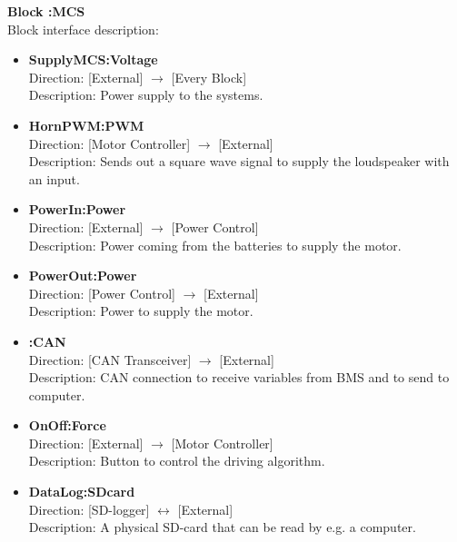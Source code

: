 \textbf{Block :MCS}\\
Block interface description:
\begin{itemize}
	\item \textbf{SupplyMCS:Voltage}\\
	Direction: [External] $\rightarrow$ [Every Block]\\
	Description: Power supply to the systems.
	\item \textbf{HornPWM:PWM}\\
	Direction: [Motor Controller] $\rightarrow$ [External]\\
	Description: Sends out a square wave signal to supply the loudspeaker with an input.
	\item \textbf{PowerIn:Power}\\
	Direction: [External] $\rightarrow$ [Power Control]\\
	Description: Power coming from the batteries to supply the motor.
	\item \textbf{PowerOut:Power}\\
	Direction: [Power Control] $\rightarrow$ [External]\\
	Description: Power to supply the motor.
	\item \textbf{:CAN}\\
	Direction: [CAN Transceiver] $\rightarrow$ [External]\\
	Description: CAN connection to receive variables from BMS and to send to computer.
	\item \textbf{OnOff:Force}\\
	Direction: [External] $\rightarrow$ [Motor Controller]\\
	Description: Button to control the driving algorithm.
	\item \textbf{DataLog:SDcard}\\
	Direction: [SD-logger] $\leftrightarrow$ [External]\\
	Description: A physical SD-card that can be read by e.g. a computer.
\end{itemize}

